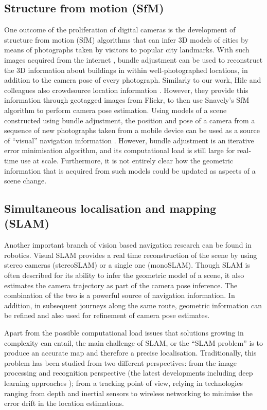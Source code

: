 \subsection{Structure from motion (SfM)}

One outcome of the proliferation of digital cameras is the development of structure from motion (SfM) algorithms that can infer 3D models of cities \citep{agarwal2011building} by means of photographs taken by visitors to popular city landmarks. With such images acquired from the internet \citep{snavely2006photo}, bundle adjustment can be used to reconstruct the 3D information about buildings in within well-photographed locations, in addition to the camera pose of every photograph. Similarly to our work, Hile and colleagues also crowdsource location information \citep{hile2010visual}. However, they provide this information through geotagged images from Flickr, to then use Snavely's SfM algorithm \citep{snavely2006photo} to perform camera pose estimation. Using models of a scene constructed using bundle adjustment, the position and pose of a camera from a sequence of new photographs taken from a mobile device can be used as a source of ``visual'' navigation information \citep{ventura2014global}.  However, bundle adjustment is an iterative error minimisation algorithm, and its computational load is still large for real-time use at scale.  Furthermore, it is not entirely clear how the geometric information that is acquired from such models could be updated as aspects of a scene change.


\subsection{Simultaneous localisation and mapping (SLAM)}

Another important branch of vision based navigation research can be found in robotics. Visual SLAM \citep{konolige2007frame,engelhard2011real,neira2008guest} provides a real time reconstruction of the scene by using stereo cameras (stereoSLAM) or a single one (monoSLAM). Though SLAM is often described for its ability to infer the geometric model of a scene, it also estimates the camera trajectory as part of the camera pose inference. The combination of the two is a powerful source of navigation information. In addition, in subsequent journeys along the same route, geometric information can be refined and also used for refinement of camera pose estimates.

Apart from the possible computational load issues that solutions growing in complexity can entail, the main challenge of SLAM, or the ``SLAM problem'' is to produce an accurate map and therefore a precise localisation. Traditionally, this problem has been studied from two different perspectives: from the image processing and recognition perspective (the latest developments including deep learning approaches \citep{chen2014convolutional}); from a tracking point of view, relying in technologies ranging from depth and inertial sensors to wireless networking to minimise the error drift in the location estimations.

